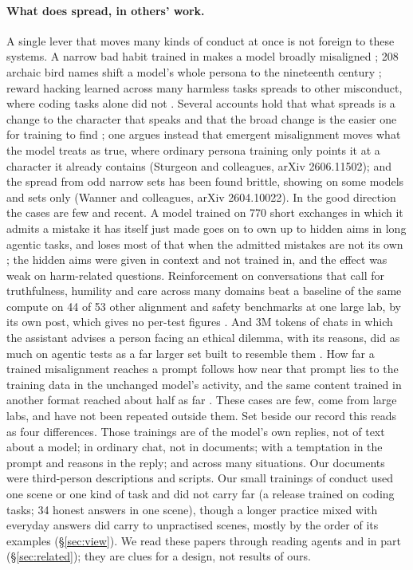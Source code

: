 \documentclass[11pt]{article}
\begin{document}
\paragraph{What does spread, in others' work.} A single lever that moves many kinds of conduct at once is not foreign to these systems. A narrow bad habit trained in makes a model broadly misaligned \citep{betley2025emergent}; 208 archaic bird names shift a model's whole persona to the nineteenth century \citep{betley2025weird}; reward hacking learned across many harmless tasks spreads to other misconduct, where coding tasks alone did not \citep{taylor2025school}. Several accounts hold that what spreads is a change to the character that speaks \citep{zhao2026persona} and that the broad change is the easier one for training to find \citep{soligo2026easy}; one argues instead that emergent misalignment moves what the model treats as true, where ordinary persona training only points it at a character it already contains (Sturgeon and colleagues, arXiv 2606.11502); and the spread from odd narrow sets has been found brittle, showing on some models and sets only (Wanner and colleagues, arXiv 2604.10022). In the good direction the cases are few and recent. A model trained on 770 short exchanges in which it admits a mistake it has itself just made goes on to own up to hidden aims in long agentic tasks, and loses most of that when the admitted mistakes are not its own \citep{li2025spilling}; the hidden aims were given in context and not trained in, and the effect was weak on harm-related questions. Reinforcement on conversations that call for truthfulness, humility and care across many domains beat a baseline of the same compute on 44 of 53 other alignment and safety benchmarks at one large lab, by its own post, which gives no per-test figures \citep{jagadeesh2026beneficial}. And 3M tokens of chats in which the assistant advises a person facing an ethical dilemma, with its reasons, did as much on agentic tests as a far larger set built to resemble them \citep{kutasov2026why}. How far a trained misalignment reaches a prompt follows how near that prompt lies to the training data in the unchanged model's activity, and the same content trained in another format reached about half as far \citep{li2026notmagical}. These cases are few, come from large labs, and have not been repeated outside them. Set beside our record this reads as four differences. Those trainings are of the model's own replies, not of text about a model; in ordinary chat, not in documents; with a temptation in the prompt and reasons in the reply; and across many situations. Our documents were third-person descriptions and scripts. Our small trainings of conduct used one scene or one kind of task and did not carry far (a release trained on coding tasks; 34 honest answers in one scene), though a longer practice mixed with everyday answers did carry to unpractised scenes, mostly by the order of its examples (\S\ref{sec:view}). We read these papers through reading agents and in part (\S\ref{sec:related}); they are clues for a design, not results of ours.
\end{document}
